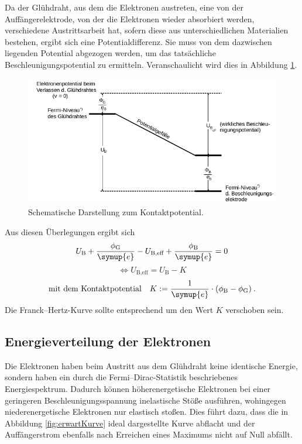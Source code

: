 Da der Glühdraht, aus dem die Elektronen austreten, eine von der Auffängerelektrode, von der die Elektronen wieder 
absorbiert werden, verschiedene Austrittsarbeit hat, sofern diese aus unterschiedlichen Materialien bestehen, ergibt 
sich eine Potentialdifferenz. Sie muss von dem dazwischen liegenden Potential abgezogen werden, um das tatsächliche 
Beschleunigungspotential zu ermitteln. 
Veranschaulicht wird dies in Abbildung \ref{fig:Kontaktpotential}.
\begin{figure}
    \centering
    \includegraphics[width=\textwidth]{plots/Kontaktpotential.png}
    \caption{Schematische Darstellung zum Kontaktpotential\cite{Versuchsanleitung}.}
    \label{fig:Kontaktpotential}
\end{figure}
Aus diesen Überlegungen ergibt sich 
\begin{equation*}
    U_\text{B}+\frac{\phi_\text{G}}{\symup{e}} -U_\text{B,eff}+\frac{\phi_\text{B}}{\symup{e}}=0
\end{equation*}
\begin{equation}
    \Leftrightarrow U_\text{B,eff}=U_\text{B}-K
\end{equation}
\begin{equation}
    \text{mit dem Kontaktpotential} \quad K:=\frac{1}{\symup{e}}\cdot (\phi_\text{B}-\phi_\text{G})\:.
\end{equation}
Die Franck--Hertz-Kurve sollte entsprechend um den Wert $K$ verschoben sein. 

\subsection{Energieverteilung der Elektronen}

Die Elektronen haben beim Austritt aus dem Glühdraht keine identische Energie, sondern haben ein durch die Fermi--Dirac-Statistik 
beschriebenes Energiespektrum. 
Dadurch können höherenergetische Elektronen bei einer geringeren Beschleunigungsspannung inelastische Stöße ausführen, 
wohingegen niederenergetische Elektronen nur elastisch stoßen. Dies führt dazu, dass die in Abbildung \ref{fig:erwartKurve}
ideal dargestellte Kurve abflacht und der Auffängerstrom ebenfalls nach Erreichen eines Maximums nicht auf Null abfällt. 

